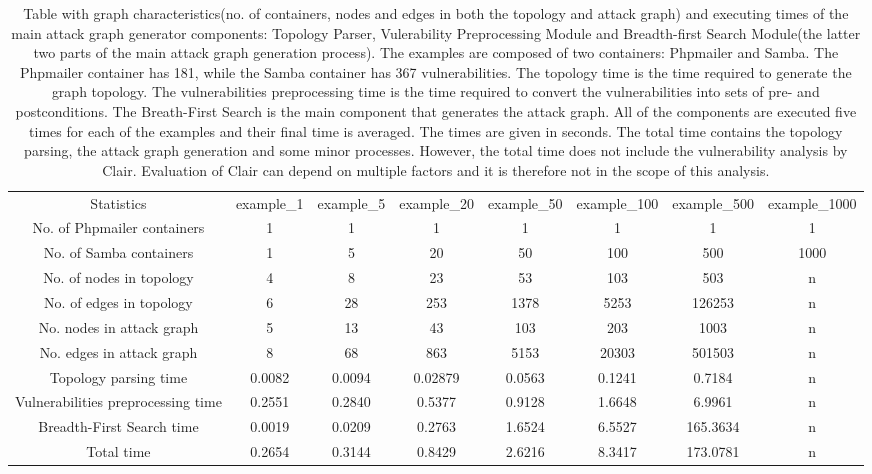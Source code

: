 \documentclass[letterpaper, 10 pt, conference]{ieeeconf}  %
\begin{document}
\begin{table}[t]
\begin{center}
	\begin{tabular}{ |c|c|c|c|c|c|c|c| } 
		\hline
		Statistics & example\_1 & example\_5 & example\_20 & example\_50 & example\_100 & example\_500 & example\_1000 \\ 
		
		No. of Phpmailer containers & 1 & 1 & 1 & 1 & 1 & 1 & 1 \\ 
		
		No. of Samba containers & 1 & 5 & 20 & 50 & 100 & 500 & 1000 \\ 
		
		No. of nodes in topology & 4 & 8 & 23 & 53 & 103 & 503 & n\\ 
		
	    No. of edges in topology & 6 & 28 & 253 & 1378 & 5253 & 126253 & n \\ 
		
		No. nodes in attack graph & 5 & 13 & 43 & 103 & 203 & 1003 & n \\ 
		
		No. edges in attack graph & 8 & 68 & 863 & 5153 & 20303 & 501503 & n \\ 
		
		Topology parsing time & 0.0082 & 0.0094 & 0.02879 & 0.0563 & 0.1241 & 0.7184 & n \\ 
		
		Vulnerabilities preprocessing time & 0.2551 & 0.2840 & 0.5377 & 0.9128 & 1.6648 & 6.9961 & n \\ 
		
		Breadth-First Search time & 0.0019 & 0.0209 & 0.2763 & 1.6524 & 6.5527 & 165.3634 & n \\ 
		
		Total time & 0.2654 & 0.3144 & 0.8429 & 2.6216 & 8.3417 & 173.0781 & n \\ 
		\hline
	\end{tabular}
\end{center}

\caption{Table with graph characteristics(no. of containers, nodes and edges in both the topology and attack graph) and executing times of the main attack graph generator components: Topology Parser, Vulerability Preprocessing Module and Breadth-first Search Module(the latter two parts of the main attack graph generation process). The examples are composed of two containers: Phpmailer and Samba. The Phpmailer container has 181, while the Samba container has 367 vulnerabilities. The topology time is the time required to generate the graph topology. The vulnerabilities preprocessing time is the time required to convert the vulnerabilities into sets of pre- and postconditions. The Breath-First Search is the main component that generates the attack graph. All of the components are executed five times for each of the examples and their final time is averaged. The times are given in seconds. The total time contains the topology parsing, the attack graph generation and some minor processes. However, the total time does not include the vulnerability analysis by Clair. Evaluation of Clair can depend on multiple factors and it is therefore not in the scope of this analysis.}


\end{table}
\end{document}
